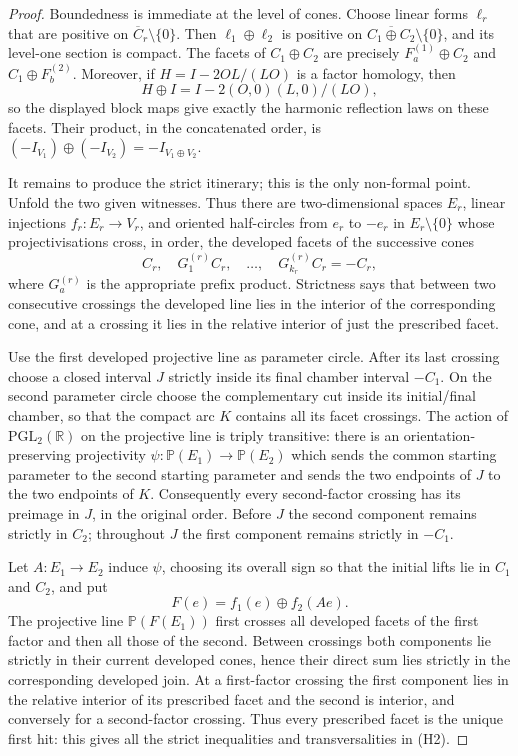 \documentclass[11pt,a4paper]{article}
\theoremstyle{plain}
\theoremstyle{definition}
\theoremstyle{remark}
\begin{document}
\begin{proof}
Boundedness is immediate at the level of cones.  Choose linear forms $\ell_r$ that
are positive on $\overline C_r\setminus\{0\}$.  Then
$\ell_1\oplus\ell_2$ is positive on
$\overline{C_1\oplus C_2}\setminus\{0\}$, and its level-one section is compact.
The facets of $C_1\oplus C_2$ are precisely
$F^{(1)}_a\oplus C_2$ and $C_1\oplus F^{(2)}_b$.  Moreover, if
$H=I-2O L/(LO)$ is a factor homology, then
\[
 H\oplus I=I-2(O,0)(L,0)/(LO),
\]
so the displayed block maps give exactly the harmonic reflection laws on these
facets.  Their product, in the concatenated order, is
$(-I_{V_1})\oplus(-I_{V_2})=-I_{V_1\oplus V_2}$.

It remains to produce the strict itinerary; this is the only non-formal point.
Unfold the two given witnesses.  Thus there are two-dimensional spaces $E_r$,
linear injections $f_r:E_r\to V_r$, and oriented half-circles from $e_r$ to $-e_r$
in $E_r\setminus\{0\}$ whose projectivisations cross, in order, the developed
facets of the successive cones
\[
 C_r,\quad G^{(r)}_1C_r,\quad\ldots,\quad
 G^{(r)}_{k_r}C_r=-C_r,
\]
where $G^{(r)}_a$ is the appropriate prefix product.  Strictness says that between
two consecutive crossings the developed line lies in the interior of the
corresponding cone, and at a crossing it lies in the relative interior of just the
prescribed facet.

Use the first developed projective line as parameter circle.  After its last
crossing choose a closed interval $J$ strictly inside its final chamber interval
$-C_1$.  On the second parameter circle choose the complementary cut inside its
initial/final chamber, so that the compact arc $K$ contains all its facet crossings.
The action of $\mathrm{PGL}_2(\mathbb R)$ on the projective line is triply
transitive: there is an orientation-preserving projectivity
$\psi:\mathbb P(E_1)\to\mathbb P(E_2)$ which sends the common starting parameter to
the second starting parameter and sends the two endpoints of $J$ to the two
endpoints of $K$.  Consequently every second-factor crossing has its preimage in
$J$, in the original order.  Before $J$ the second component remains strictly in
$C_2$; throughout $J$ the first component remains strictly in $-C_1$.

Let $A:E_1\to E_2$ induce $\psi$, choosing its overall sign so that the initial
lifts lie in $C_1$ and $C_2$, and put
\[
       F(e)=f_1(e)\oplus f_2(Ae).
\]
The projective line $\mathbb P(F(E_1))$ first crosses all developed facets of the
first factor and then all those of the second.  Between crossings both components
lie strictly in their current developed cones, hence their direct sum lies strictly
in the corresponding developed join.  At a first-factor crossing the first
component lies in the relative interior of its prescribed facet and the second is
interior, and conversely for a second-factor crossing.  Thus every prescribed facet
is the unique first hit: this gives all the strict inequalities and transversalities
in \textup{(H2)}.


\end{proof}
\end{document}
